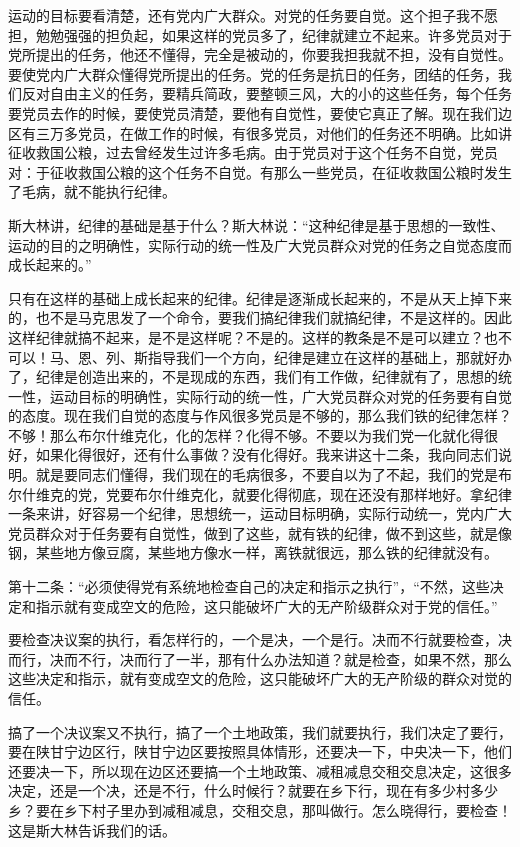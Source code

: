 运动的目标要看清楚，还有党内广大群众。对党的任务要自觉。这个担子我不愿担，勉勉强强的担负起，如果这样的党员多了，纪律就建立不起来。许多党员对于党所提出的任务，他还不懂得，完全是被动的，你要我担我就不担，没有自觉性。要使党内广大群众懂得党所提出的任务。党的任务是抗日的任务，团结的任务，我们反对自由主义的任务，要精兵简政，要整顿三风，大的小的这些任务，每个任务要党员去作的时候，要使党员清楚，要他有自觉性，要使它真正了解。现在我们边区有三万多党员，在做工作的时候，有很多党员，对他们的任务还不明确。比如讲征收救国公粮，过去曾经发生过许多毛病。由于党员对于这个任务不自觉，党员对：于征收救国公粮的这个任务不自觉。有那么一些党员，在征收救国公粮时发生了毛病，就不能执行纪律。

斯大林讲，纪律的基础是基于什么？斯大林说：“这种纪律是基于思想的一致性、运动的目的之明确性，实际行动的统一性及广大党员群众对党的任务之自觉态度而成长起来的。”

只有在这样的基础上成长起来的纪律。纪律是逐渐成长起来的，不是从天上掉下来的，也不是马克思发了一个命令，要我们搞纪律我们就搞纪律，不是这样的。因此这样纪律就搞不起来，是不是这样呢？不是的。这样的教条是不是可以建立？也不可以！马、恩、列、斯指导我们一个方向，纪律是建立在这样的基础上，那就好办了，纪律是创造出来的，不是现成的东西，我们有工作做，纪律就有了，思想的统一性，运动目标的明确性，实际行动的统一性，广大党员群众对党的任务要有自觉的态度。现在我们自觉的态度与作风很多党员是不够的，那么我们铁的纪律怎样？不够！那么布尔什维克化，化的怎样？化得不够。不要以为我们党一化就化得很好，如果化得很好，还有什么事做？没有化得好。我来讲这十二条，我向同志们说明。就是要同志们懂得，我们现在的毛病很多，不要自以为了不起，我们的党是布尔什维克的党，党要布尔什维克化，就要化得彻底，现在还没有那样地好。拿纪律一条来讲，好容易一个纪律，思想统一，运动目标明确，实际行动统一，党内广大党员群众对于任务要有自觉性，做到了这些，就有铁的纪律，做不到这些，就是像钢，某些地方像豆腐，某些地方像水一样，离铁就很远，那么铁的纪律就没有。

第十二条：“必须使得党有系统地检查自己的决定和指示之执行”，“不然，这些决定和指示就有变成空文的危险，这只能破坏广大的无产阶级群众对于党的信任。”

要检查决议案的执行，看怎样行的，一个是决，一个是行。决而不行就要检查，决而行，决而不行，决而行了一半，那有什么办法知道？就是检查，如果不然，那么这些决定和指示，就有变成空文的危险，这只能破坏广大的无产阶级的群众对觉的信任。

搞了一个决议案又不执行，搞了一个土地政策，我们就要执行，我们决定了要行，要在陕甘宁边区行，陕甘宁边区要按照具体情形，还要决一下，中央决一下，他们还要决一下，所以现在边区还要搞一个土地政策、减租减息交租交息决定，这很多决定，还是一个决，还是不行，什么时候行？就要在乡下行，现在有多少村多少乡？要在乡下村子里办到减租减息，交租交息，那叫做行。怎么晓得行，要检查！这是斯大林告诉我们的话。

